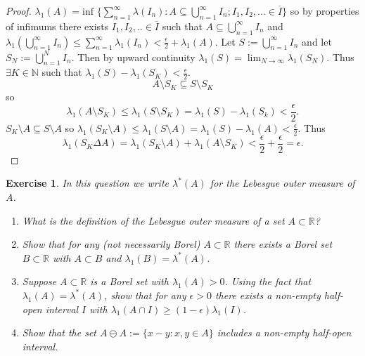 \documentclass{article}
\newtheorem{exercise}[theorem]{Exercise}
\begin{document}
\begin{proof}
$\lambda_1(A)=\text{inf }\{\sum_{n=1}^\infty\lambda(I_n):A\subseteq\bigcup_{n=1}^\infty I_n;I_1,I_2,...\in \overline{I}\}$ so by properties of infimums there exists $I_1,I_2,..\in\overline{I}$ such that $A\subseteq \bigcup_{n=1}^\infty I_n$ and $\lambda_1(\bigcup_{n=1}^\infty I_n)\leq\sum_{n=1}^\infty\lambda_1(I_n)<\frac{\epsilon}{2}+\lambda_1(A)$. Let $S:=\bigcup_{n=1}^\infty I_n$ and let $S_N:=\bigcup_{n=1}^N I_n$. Then by upward continuity $\lambda_1(S)=\lim_{N\to\infty}\lambda_1(S_N)$. Thus $\exists K\in\mathbb{N}$ such that $\lambda_1(S)-\lambda_1(S_K)<\frac{\epsilon}{2}$. \[A\setminus S_K\subseteq S\setminus S_K\] so \[\lambda_1(A\setminus S_K)\leq\lambda_1(S\setminus S_K)=\lambda_1(S)-\lambda_1(S_k)<\frac{\epsilon}{2}.\] $S_K\setminus A\subseteq S\setminus A$ so $\lambda_1(S_K\setminus A)\leq\lambda_1(S\setminus A)=\lambda_1(S)-\lambda_1(A)<\frac{\epsilon}{2}$. Thus \[\lambda_1(S_K\Delta A)=\lambda_1(S_K\setminus A)+\lambda_1(A\setminus S_K)<\frac{\epsilon}{2}+\frac{\epsilon}{2}=\epsilon.\]
\end{proof}
\begin{exercise}
    In this question we write $\lambda^*(A)$ for the Lebesgue outer measure of $A$.
    \begin{enumerate}
        \item What is the definition of the \textit{Lebesgue outer measure} of a set $A \subset \mathbb{R}$?
        \item Show that for any (not necessarily Borel) $A \subset \mathbb{R}$ there exists a Borel set $B \subset \mathbb{R}$ with $A \subset B$ and $\lambda_1(B) = \lambda^*(A)$.
        \item Suppose $A \subset \mathbb{R}$ is a Borel set with $\lambda_1(A) > 0$. Using the fact that $\lambda_1(A) = \lambda^*(A)$, show that for any $\epsilon > 0$ there exists a non-empty half-open interval $I$ with $\lambda_1(A \cap I) \geq (1 - \epsilon)\lambda_1(I)$.
        \item Show that the set $A \ominus A := \{x - y : x, y \in A\}$ includes a non-empty half-open interval.
    \end{enumerate}
\end{exercise}
\end{document}
